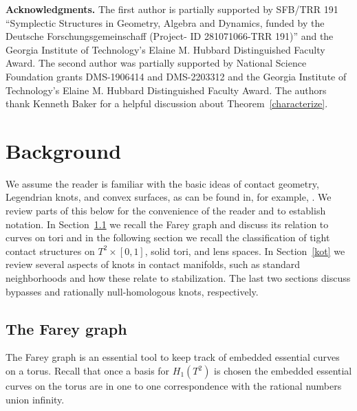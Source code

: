 \documentclass[11pt]{amsart}
\theoremstyle{plain}
\theoremstyle{definition}
\theoremstyle{remark}
\numberwithin{theorem}{section}
\begin{document}
\noindent
{\bf Acknowledgments.} The first author is partially supported by SFB/TRR 191 ``Symplectic Structures in Geometry, Algebra and Dynamics, funded by the Deutsche Forschungsgemeinschaff (Project- ID 281071066-TRR 191)'' and the Georgia Institute of Technology's Elaine M. Hubbard Distinguished Faculty Award. The second author was partially supported by National Science Foundation grants DMS-1906414 and DMS-2203312 and the Georgia Institute of Technology's Elaine M. Hubbard Distinguished Faculty Award. The authors thank Kenneth Baker for a helpful discussion about Theorem~\ref{characterize}.



\section{Background}\label{background}

We assume the reader is familiar with the basic ideas of contact geometry, Legendrian knots, and convex surfaces, as can be found in, for example, \cite{EtnyreHonda01, Geiges08,Honda00a}. We review parts of this below for the convenience of the reader and to establish notation. In Section~\ref{fgraph} we recall the Farey graph and discuss its relation to curves on tori and in the following section we recall the classification of tight contact structures on $T^2\times[0,1]$, solid tori, and lens spaces. In Section~\ref{kot} we review several aspects of knots in contact manifolds, such as standard neighborhoods and how these relate to stabilization. The last two sections discuss bypasses and rationally null-homologous knots, respectively. 

\subsection{The Farey graph}\label{fgraph}
The Farey graph is an essential tool to keep track of embedded essential curves on a torus. Recall that once a basis for $H_1(T^2)$ is chosen the embedded essential curves on the torus are in one to one correspondence with the rational numbers union infinity.
\end{document}
